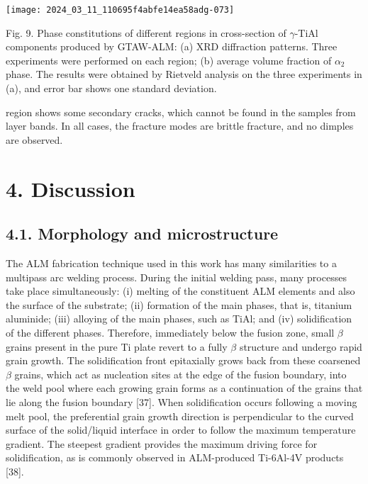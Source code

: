 \documentclass[10pt]{article}
\begin{document}
\begin{center}
\texttt{[image: 2024\_03\_11\_110695f4abfe14ea58adg-073]}
\end{center}

Fig. 9. Phase constitutions of different regions in cross-section of $\gamma$-TiAl components produced by GTAW-ALM: (a) XRD diffraction patterns. Three experiments were performed on each region; (b) average volume fraction of $\alpha_{2}$ phase. The results were obtained by Rietveld analysis on the three experiments in (a), and error bar shows one standard deviation.

region shows some secondary cracks, which cannot be found in the samples from layer bands. In all cases, the fracture modes are brittle fracture, and no dimples are observed.

\section*{4. Discussion}
\subsection*{4.1. Morphology and microstructure}
The ALM fabrication technique used in this work has many similarities to a multipass arc welding process. During the initial welding pass, many processes take place simultaneously: (i) melting of the constituent ALM elements and also the surface of the substrate; (ii) formation of the main phases, that is, titanium aluminide; (iii) alloying of the main phases, such as TiAl; and (iv) solidification of the different phases. Therefore, immediately below the fusion zone, small $\beta$ grains present in the pure Ti plate revert to a fully $\beta$ structure and undergo rapid grain growth. The solidification front epitaxially grows back from these coarsened $\beta$ grains, which act as nucleation sites at the edge of the fusion boundary, into the weld pool where each growing grain forms as a continuation of the grains that lie along the fusion boundary [37]. When solidification occurs following a moving melt pool, the preferential grain growth direction is perpendicular to the curved surface of the solid/liquid interface in order to follow the maximum temperature gradient. The steepest gradient provides the maximum driving force for solidification, as is commonly observed in ALM-produced Ti-6Al-4V products [38].
\end{document}
